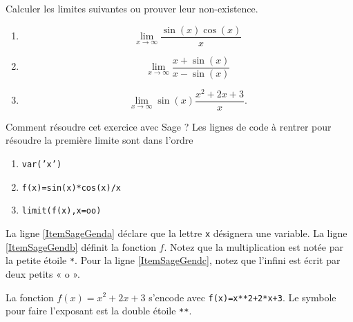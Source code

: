

\begin{exercice}\label{exoINGE11140028}

	Calculer les limites suivantes ou prouver leur non-existence.
	\begin{enumerate}

		\item
			\begin{equation}
				\lim_{x\to\infty}\frac{ \sin(x)\cos(x) }{ x }
			\end{equation}
		\item
			\begin{equation}
				\lim_{x\to\infty}\frac{ x+\sin(x) }{ x-\sin(x) }
			\end{equation}
		\item
			\begin{equation}
				\lim_{x\to \infty} \sin(x)\frac{ x^2+2x+3 }{ x }.
			\end{equation}

	\end{enumerate}

	Comment résoudre cet exercice avec Sage ? Les lignes de code à rentrer pour résoudre la première limite sont dans l'ordre
	\begin{enumerate}

		\item	\label{ItemSageGenda}
			\texttt{var('x')}
		\item\label{ItemSageGendb}
			\texttt{f(x)=sin(x)*cos(x)/x}
		\item\label{ItemSageGendc}
			\texttt{limit(f(x),x=oo)}

	\end{enumerate}
	La ligne \ref{ItemSageGenda} déclare que la lettre \texttt{x} désignera une variable. La ligne \ref{ItemSageGendb} définit la fonction $f$. Notez que la multiplication est notée par la petite étoile \texttt{*}. Pour la ligne \ref{ItemSageGendc}, notez que l'infini est écrit par deux petits « o ».

	La fonction $f(x)=x^2+2x+3$ s'encode avec \texttt{f(x)=x**2+2*x+3}. Le symbole pour faire l'exposant est la double étoile \texttt{**}.

\end{exercice}
